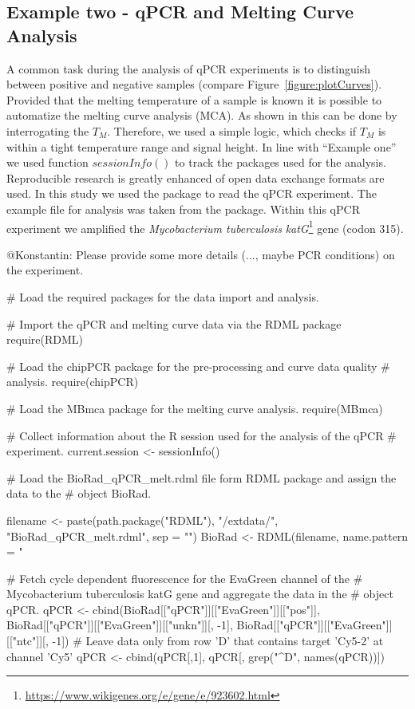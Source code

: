 \subsection{Example two - qPCR and Melting Curve Analysis}

A common task during the analysis of qPCR experiments is to distinguish between 
positive and negative samples (compare Figure~\ref{figure:plotCurves}). Provided 
that the melting temperature of a sample is known it is possible to automatize 
the melting curve analysis (MCA). As shown in \citet{roediger_RJ_2013} this can 
be done by interrogating the $T_{M}$. Therefore, we used a simple logic, which 
checks if $T_{M}$ is within a tight temperature range and signal height. In line 
with ``Example one'' we used function $sessionInfo()$ to track the packages used 
for the analysis. Reproducible research is greatly enhanced of open data 
exchange formats are used. In this study we used the  package to 
read the qPCR experiment. The example file  for 
analysis was taken from the  package. Within this qPCR experiment 
we amplified the \textit{Mycobacterium tuberculosis} 
\textit{katG}\footnote{\url{https://www.wikigenes.org/e/gene/e/923602.html}} 
gene (codon 315).

@Konstantin: Please provide some more details (..., 
maybe PCR conditions) on the experiment.

\begin{example}
# Load the required packages for the data import and analysis.

# Import the qPCR and melting curve data via the RDML package
require(RDML)

# Load the chipPCR package for the pre-processing and curve data quality
# analysis.
require(chipPCR)

# Load the MBmca package for the melting curve analysis.
require(MBmca)

# Collect information about the R session used for the analysis of the qPCR
# experiment.
current.session <- sessionInfo()


# Load the BioRad_qPCR_melt.rdml file form RDML package and assign the data to the
# object BioRad.

filename <- paste(path.package("RDML"), "/extdata/", "BioRad_qPCR_melt.rdml", sep = "")
BioRad <- RDML(filename, name.pattern = "%

# Fetch cycle dependent fluorescence for the EvaGreen channel of the 
# Mycobacterium tuberculosis katG gene and aggregate the data in the 
# object qPCR. 
qPCR <- cbind(BioRad[["qPCR"]][["EvaGreen"]][["pos"]], 
	      BioRad[["qPCR"]][["EvaGreen"]][["unkn"]][, -1], 
	      BioRad[["qPCR"]][["EvaGreen"]][["ntc"]][, -1])
# Leave data only from row 'D' that contains target 'Cy5-2' at channel 'Cy5'
qPCR <- cbind(qPCR[,1], qPCR[, grep("^D", names(qPCR))])
\end{example}

